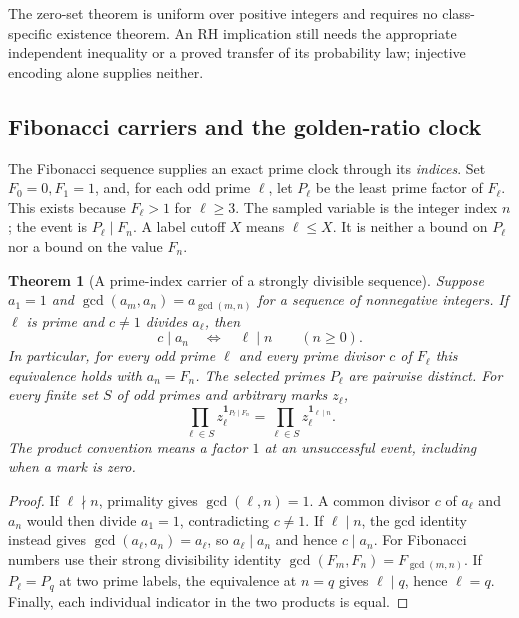\documentclass[11pt]{article}
\newtheorem{theorem}{Theorem}[section]
\theoremstyle{definition}
\begin{document}
The zero-set theorem is uniform over positive integers and requires
no class-specific existence theorem. An RH implication still needs
the appropriate independent inequality or a proved transfer of its
probability law; injective encoding alone supplies neither.

\subsection{Fibonacci carriers and the golden-ratio clock}
\label{sec:fibonacci-golden-carriers}

The Fibonacci sequence supplies an exact prime clock through its
\emph{indices}. Set $F_0=0,F_1=1$, and, for each odd prime $\ell$,
let $P_\ell$ be the least prime factor of $F_\ell$.
This exists because $F_\ell>1$ for $\ell\ge3$.
The sampled variable is the integer index $n$; the event is
$P_\ell\mid F_n$. A label cutoff $X$ means $\ell\le X$.
It is neither a bound on $P_\ell$ nor a bound on the value $F_n$.

\begin{theorem}[A prime-index carrier of a strongly divisible sequence]
\label{thm:strong-divisibility-carrier}
Suppose $a_1=1$ and
$\gcd(a_m,a_n)=a_{\gcd(m,n)}$ for a sequence of nonnegative integers.
If $\ell$ is prime and $c\ne1$ divides $a_\ell$, then
\[
 c\mid a_n\quad\Longleftrightarrow\quad\ell\mid n
 \qquad(n\ge0).
\]
In particular, for every odd prime $\ell$ and every prime divisor
$c$ of $F_\ell$ this equivalence holds with $a_n=F_n$.
The selected primes $P_\ell$ are pairwise distinct.
For every finite set $S$ of odd primes and arbitrary marks $z_\ell$,
\[
 \prod_{\ell\in S}
   z_\ell^{\boldsymbol{1}_{P_\ell\mid F_n}}
 =
 \prod_{\ell\in S}
   z_\ell^{\boldsymbol{1}_{\ell\mid n}}.
\]
The product convention means a factor $1$ at an unsuccessful event,
including when a mark is zero.
\end{theorem}

\begin{proof}
If $\ell\nmid n$, primality gives $\gcd(\ell,n)=1$.
A common divisor $c$ of $a_\ell$ and $a_n$ would then divide
$a_1=1$, contradicting $c\ne1$. If $\ell\mid n$, the gcd identity
instead gives $\gcd(a_\ell,a_n)=a_\ell$, so
$a_\ell\mid a_n$ and hence $c\mid a_n$.
For Fibonacci numbers use their strong divisibility identity
$\gcd(F_m,F_n)=F_{\gcd(m,n)}$.
If $P_\ell=P_q$ at two prime labels, the equivalence at $n=q$
gives $\ell\mid q$, hence $\ell=q$.
Finally, each individual indicator in the two products is equal.
\end{proof}
\end{document}
